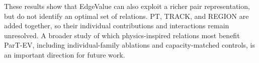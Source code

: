 These results show that EdgeValue can also exploit a richer pair
representation, but do not identify an optimal set of relations. PT, TRACK,
and REGION are added together, so their individual contributions and
interactions remain unresolved. A broader study of which physics-inspired
relations most benefit ParT-EV, including individual-family ablations and
capacity-matched controls, is an important direction for future work.
